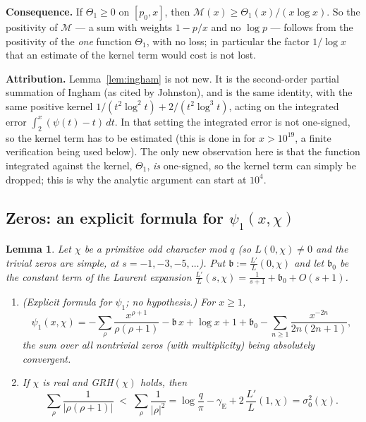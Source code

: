 \documentclass[11pt]{amsart}
\newtheorem{lemma}[theorem]{Lemma}
\theoremstyle{definition}
\numberwithin{equation}{section}
\newcommand{\cM}{\mathcal M}          %
\begin{document}
\medskip\noindent\textbf{Consequence.} If $\Theta_1\ge0$ on
$[p_0,x]$, then $\cM(x)\ge\Theta_1(x)/(x\log x)$. So the positivity
of $\cM$ --- a sum with weights $1-p/x$ and no $\log p$ --- follows
from the positivity of the \emph{one} function $\Theta_1$, with no
loss; in particular the factor $1/\log x$ that an estimate of the
kernel term would cost is not lost.

\medskip\noindent\textbf{Attribution.} Lemma~\ref{lem:ingham} is not
new. It is the second-order partial summation of Ingham
\cite[pp.~103--104]{Ing32} (as cited by Johnston), and
\cite[Lemma~2.7]{Joh23} is the same identity, with the same positive
kernel $1/(t^2\log^2t)+2/(t^2\log^3t)$, acting on the integrated
error $\int_2^x(\psi(t)-t)\,dt$. In that setting the integrated error
is not one-signed, so the kernel term has to be estimated (this is
done in \cite{Joh23} for $x>10^{19}$, a finite verification being
used below). The only new observation here is that the function
integrated against the kernel, $\Theta_1$, \emph{is} one-signed, so
the kernel term can simply be dropped; this is why the analytic
argument can start at $10^4$.

\subsection{Zeros: an explicit formula for
\texorpdfstring{$\psi_1(x,\chi)$}{psi\_1(x,chi)}}

\begin{lemma}\label{lem:zerosq}
Let $\chi$ be a primitive odd character mod $q$ (so $L(0,\chi)\ne0$
and the trivial zeros are simple, at $s=-1,-3,-5,\dots$). Put
$\mathfrak b:=\frac{L'}{L}(0,\chi)$ and let $\mathfrak b_0$ be the
constant term of the Laurent expansion
$\frac{L'}{L}(s,\chi)=\frac1{s+1}+\mathfrak b_0+O(s+1)$.
\begin{enumerate}
\item[(a)] \emph{(Explicit formula for $\psi_1$; no hypothesis.)} For
$x\ge1$,
\[
\psi_1(x,\chi)=-\sum_\rho\frac{x^{\rho+1}}{\rho(\rho+1)}
-\mathfrak b\,x+\log x+1+\mathfrak b_0
-\sum_{n\ge1}\frac{x^{-2n}}{2n(2n+1)},
\]
the sum over all nontrivial zeros (with multiplicity) being
absolutely convergent.
\item[(b)] If $\chi$ is real and GRH$(\chi)$ holds, then
\[
\sum_\rho\frac1{|\rho(\rho+1)|}\;<\;\sum_\rho\frac1{|\rho|^2}
=\log\frac q\pi-\gamma_{\mathrm E}+2\,\frac{L'}{L}(1,\chi)=\sigma_0^2(\chi).
\]
\end{enumerate}
\end{lemma}
\end{document}
